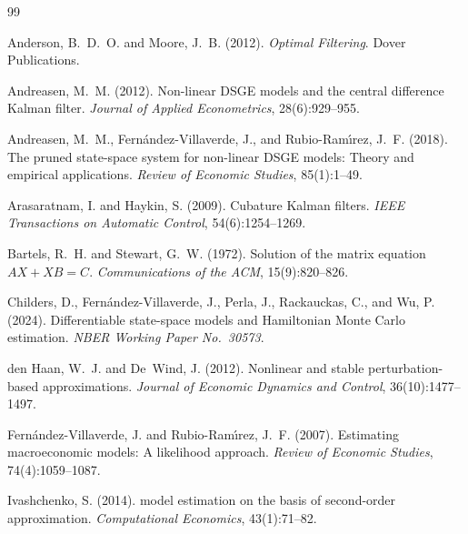 \documentclass[12pt,a4paper]{article}
\begin{document}
\begin{thebibliography}{99}

Anderson, B.~D.~O. and Moore, J.~B. (2012).
\newblock \emph{Optimal Filtering}.
\newblock Dover Publications.

Andreasen, M.~M. (2012).
\newblock Non-linear {DSGE} models and the central difference {Kalman} filter.
\newblock \emph{Journal of Applied Econometrics}, 28(6):929--955.

Andreasen, M.~M., Fern{\'a}ndez-Villaverde, J., and Rubio-Ram{\'\i}rez,
  J.~F. (2018).
\newblock The pruned state-space system for non-linear {DSGE} models: Theory
  and empirical applications.
\newblock \emph{Review of Economic Studies}, 85(1):1--49.

Arasaratnam, I. and Haykin, S. (2009).
\newblock Cubature {Kalman} filters.
\newblock \emph{IEEE Transactions on Automatic Control}, 54(6):1254--1269.

Bartels, R.~H. and Stewart, G.~W. (1972).
\newblock Solution of the matrix equation {$AX + XB = C$}.
\newblock \emph{Communications of the ACM}, 15(9):820--826.

Childers, D., Fern{\'a}ndez-Villaverde, J., Perla, J., Rackauckas, C.,
  and Wu, P. (2024).
\newblock Differentiable state-space models and {Hamiltonian Monte Carlo}
  estimation.
\newblock \emph{NBER Working Paper No.~30573}.

den Haan, W.~J. and De~Wind, J. (2012).
\newblock Nonlinear and stable perturbation-based approximations.
\newblock \emph{Journal of Economic Dynamics and Control},
  36(10):1477--1497.

Fern{\'a}ndez-Villaverde, J. and Rubio-Ram{\'\i}rez, J.~F. (2007).
\newblock Estimating macroeconomic models: A likelihood approach.
\newblock \emph{Review of Economic Studies}, 74(4):1059--1087.

Ivashchenko, S. (2014).
 model estimation on the basis of second-order approximation.
\newblock \emph{Computational Economics}, 43(1):71--82.


\end{thebibliography}
\end{document}
